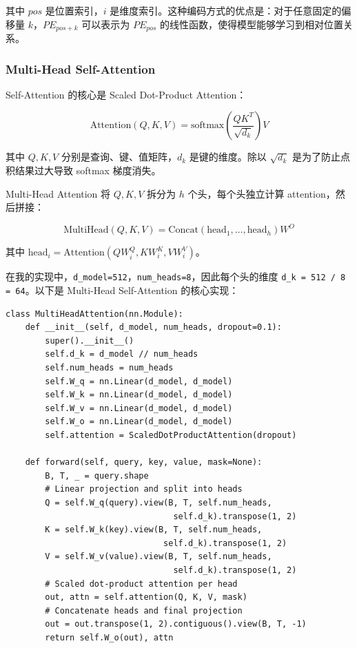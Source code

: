 \documentclass[a4paper]{article}
\begin{document}
其中 $pos$ 是位置索引，$i$ 是维度索引。这种编码方式的优点是：对于任意固定的偏移量 $k$，$PE_{pos+k}$ 可以表示为 $PE_{pos}$ 的线性函数，使得模型能够学习到相对位置关系。

\subsubsection{Multi-Head Self-Attention}

Self-Attention 的核心是 Scaled Dot-Product Attention：

\begin{equation}
\text{Attention}(Q, K, V) = \text{softmax}\left(\frac{QK^T}{\sqrt{d_k}}\right) V
\end{equation}

其中 $Q, K, V$ 分别是查询、键、值矩阵，$d_k$ 是键的维度。除以 $\sqrt{d_k}$ 是为了防止点积结果过大导致 softmax 梯度消失。

Multi-Head Attention 将 $Q, K, V$ 拆分为 $h$ 个头，每个头独立计算 attention，然后拼接：

\begin{equation}
\text{MultiHead}(Q, K, V) = \text{Concat}(\text{head}_1, \ldots, \text{head}_h) W^O
\end{equation}

其中 $\text{head}_i = \text{Attention}(Q W_i^Q, K W_i^K, V W_i^V)$。

在我的实现中，\texttt{d\_model=512}，\texttt{num\_heads=8}，因此每个头的维度 \texttt{d\_k = 512 / 8 = 64}。以下是 Multi-Head Self-Attention 的核心实现：

\begin{codebox}
\begin{lstlisting}[style=pyframe]
class MultiHeadAttention(nn.Module):
    def __init__(self, d_model, num_heads, dropout=0.1):
        super().__init__()
        self.d_k = d_model // num_heads
        self.num_heads = num_heads
        self.W_q = nn.Linear(d_model, d_model)
        self.W_k = nn.Linear(d_model, d_model)
        self.W_v = nn.Linear(d_model, d_model)
        self.W_o = nn.Linear(d_model, d_model)
        self.attention = ScaledDotProductAttention(dropout)

    def forward(self, query, key, value, mask=None):
        B, T, _ = query.shape
        # Linear projection and split into heads
        Q = self.W_q(query).view(B, T, self.num_heads,
                                  self.d_k).transpose(1, 2)
        K = self.W_k(key).view(B, T, self.num_heads,
                                self.d_k).transpose(1, 2)
        V = self.W_v(value).view(B, T, self.num_heads,
                                  self.d_k).transpose(1, 2)
        # Scaled dot-product attention per head
        out, attn = self.attention(Q, K, V, mask)
        # Concatenate heads and final projection
        out = out.transpose(1, 2).contiguous().view(B, T, -1)
        return self.W_o(out), attn
\end{lstlisting}
\end{codebox}
\end{document}
